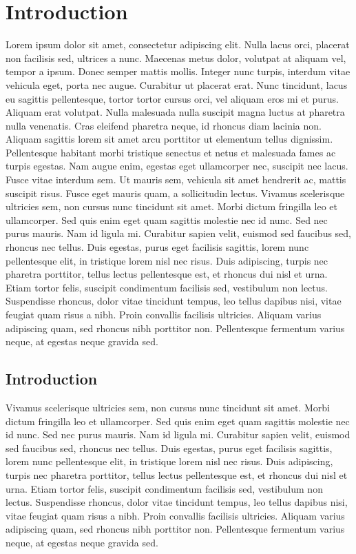 \documentclass[12pt,a4paper,titlepage]{report}
\begin{document}
\chapter{Introduction}
Lorem ipsum dolor sit amet, consectetur adipiscing elit. Nulla lacus orci, placerat non facilisis sed, ultrices a nunc. Maecenas metus dolor, volutpat at aliquam vel, tempor a ipsum. Donec semper mattis mollis. Integer nunc turpis, interdum vitae vehicula eget, porta nec augue. Curabitur ut placerat erat. Nunc tincidunt, lacus eu sagittis pellentesque, tortor tortor cursus orci, vel aliquam eros mi et purus. Aliquam erat volutpat. Nulla malesuada nulla suscipit magna luctus at pharetra nulla venenatis. Cras eleifend pharetra neque, id rhoncus diam lacinia non. Aliquam sagittis lorem sit amet arcu porttitor ut elementum tellus dignissim. Pellentesque habitant morbi tristique senectus et netus et malesuada fames ac turpis egestas. Nam augue enim, egestas eget ullamcorper nec, suscipit nec lacus. Fusce vitae interdum sem. Ut mauris sem, vehicula sit amet hendrerit ac, mattis suscipit risus. Fusce eget mauris quam, a sollicitudin lectus.
Vivamus scelerisque ultricies sem, non cursus nunc tincidunt sit amet. Morbi dictum fringilla leo et ullamcorper. Sed quis enim eget quam sagittis molestie nec id nunc. Sed nec purus mauris. Nam id ligula mi. Curabitur sapien velit, euismod sed faucibus sed, rhoncus nec tellus. Duis egestas, purus eget facilisis sagittis, lorem nunc pellentesque elit, in tristique lorem nisl nec risus. Duis adipiscing, turpis nec pharetra porttitor, tellus lectus pellentesque est, et rhoncus dui nisl et urna. Etiam tortor felis, suscipit condimentum facilisis sed, vestibulum non lectus. Suspendisse rhoncus, dolor vitae tincidunt tempus, leo tellus dapibus nisi, vitae feugiat quam risus a nibh. Proin convallis facilisis ultricies. Aliquam varius adipiscing quam, sed rhoncus nibh porttitor non. Pellentesque fermentum varius neque, at egestas neque gravida sed.

\section{Introduction}
Vivamus scelerisque ultricies sem, non cursus nunc tincidunt sit amet. Morbi dictum fringilla leo et ullamcorper. Sed quis enim eget quam sagittis molestie nec id nunc. Sed nec purus mauris. Nam id ligula mi. Curabitur sapien velit, euismod sed faucibus sed, rhoncus nec tellus. Duis egestas, purus eget facilisis sagittis, lorem nunc pellentesque elit, in tristique lorem nisl nec risus. Duis adipiscing, turpis nec pharetra porttitor, tellus lectus pellentesque est, et rhoncus dui nisl et urna. Etiam tortor felis, suscipit condimentum facilisis sed, vestibulum non lectus. Suspendisse rhoncus, dolor vitae tincidunt tempus, leo tellus dapibus nisi, vitae feugiat quam risus a nibh. Proin convallis facilisis ultricies. Aliquam varius adipiscing quam, sed rhoncus nibh porttitor non. Pellentesque fermentum varius neque, at egestas neque gravida sed.
\end{document}

